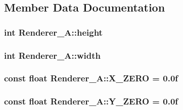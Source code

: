 \subsection{Member Data Documentation}
\hypertarget{class_renderer___a_a36d0dfb8eeccad9e1ff0b0c461632f6a}{
\subsubsection[{height}]{\setlength{\rightskip}{0pt plus 5cm}int Renderer\-\_\-\-A\-::height\hspace{0.3cm}{\ttfamily [protected]}}}\label{class_renderer___a_a36d0dfb8eeccad9e1ff0b0c461632f6a}
\hypertarget{class_renderer___a_a0ca3fbb31eb776ee00b70536f267dfe7}{
\subsubsection[{width}]{\setlength{\rightskip}{0pt plus 5cm}int Renderer\-\_\-\-A\-::width\hspace{0.3cm}{\ttfamily [protected]}}}\label{class_renderer___a_a0ca3fbb31eb776ee00b70536f267dfe7}
\hypertarget{class_renderer___a_aeab3b86fbef2f719f01fdbf0792d4848}{
\subsubsection[{X\-\_\-\-Z\-E\-R\-O}]{\setlength{\rightskip}{0pt plus 5cm}const float Renderer\-\_\-\-A\-::\-X\-\_\-\-Z\-E\-R\-O = 0.\-0f\hspace{0.3cm}{\ttfamily [static]}}}\label{class_renderer___a_aeab3b86fbef2f719f01fdbf0792d4848}
\hypertarget{class_renderer___a_ac2d79b93854681441cb48f96cb7e9f93}{
\subsubsection[{Y\-\_\-\-Z\-E\-R\-O}]{\setlength{\rightskip}{0pt plus 5cm}const float Renderer\-\_\-\-A\-::\-Y\-\_\-\-Z\-E\-R\-O = 0.\-0f\hspace{0.3cm}{\ttfamily [static]}}}\label{class_renderer___a_ac2d79b93854681441cb48f96cb7e9f93}


